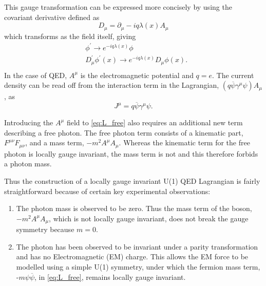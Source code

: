 This gauge transformation can be expressed more concisely by using the covariant derivative defined as
\begin{equation}
 D_{\mu} = \partial_{\mu} - iq\lambda(x)A_{\mu}
\end{equation}
which transforms as the field itself, giving %
\begin{equation}
  \begin{split}
    &\phi^\prime  \to e^{-iq\lambda(x)}\phi\\
    &D_{\mu}^{\prime}\phi^\prime(x) \to e^{-iq\lambda(x)}D_{\mu}\phi(x).\\
  \end{split}
\end{equation}
In the case of QED, $A^{\mu}$ is the electromagnetic potential and $q = e$. The current density can be read off from the interaction term in the Lagrangian, $(q\overline{\psi}\gamma^{\mu}\psi)A_{\mu}$, as
\begin{equation}
  J^{\mu} = q\overline{\psi}\gamma^{\mu}\psi.
\end{equation}

Introducing the $A^{\mu}$ field to \autoref{eq:L_free} also requires an additional new term describing a free photon. The free photon term consists of a kinematic part, $F^{\mu\nu}F_{\mu\nu}$, and a mass term, $-m^{2}A^{\mu}A_{\mu}$. Whereas the kinematic term for the free photon is locally gauge invariant, the mass term is not and this therefore forbids a photon mass.

Thus the construction of a locally gauge invariant U(1) QED Lagrangian is fairly straightforward because of certain key experimental observations:
\begin{enumerate}
\item
  The photon mass is observed to be zero. Thus the mass term of the boson, $-m^{2}A^{\mu}A_{\mu}$, which is not locally gauge invariant, does not break the gauge symmetry because $m=0$.
\item
  The photon has been observed to be invariant under a parity transformation and has no Electromagnetic (\Gls{EM}) charge. This allows the EM force to be modelled using a  simple U(1) symmetry, under which the fermion mass term, -$m\psi\overline{\psi}$, in \autoref{eq:L_free}, remains locally gauge invariant.

\end{enumerate}
